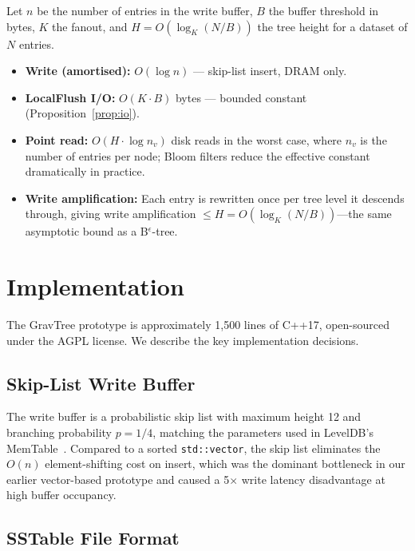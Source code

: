 \documentclass[10pt,twocolumn]{article}
\begin{document}
Let $n$ be the number of entries in the write buffer, $B$ the buffer threshold
in bytes, $K$ the fanout, and $H = O(\log_K (N/B))$ the tree height for
a dataset of $N$ entries.

\begin{itemize}
  \item \textbf{Write (amortised):} $O(\log n)$ --- skip-list insert, DRAM
        only.
  \item \textbf{LocalFlush I/O:} $O(K \cdot B)$ bytes --- bounded constant
        (Proposition~\ref{prop:io}).
  \item \textbf{Point read:} $O(H \cdot \log n_v)$ disk reads in the worst
        case, where $n_v$ is the number of entries per node; Bloom filters
        reduce the effective constant dramatically in practice.
  \item \textbf{Write amplification:} Each entry is rewritten once per tree
        level it descends through, giving write amplification $\leq H =
        O(\log_K (N/B))$---the same asymptotic bound as a B$^\epsilon$-tree.
\end{itemize}

\section{Implementation}
\label{sec:impl}

The GravTree prototype is approximately 1,500 lines of C++17, open-sourced
under the AGPL license.  We describe the key implementation decisions.

\subsection{Skip-List Write Buffer}

The write buffer is a probabilistic skip list with maximum height 12 and
branching probability $p = 1/4$, matching the parameters used in LevelDB's
MemTable~\cite{leveldb}.  Compared to a sorted \texttt{std::vector}, the skip
list eliminates the $O(n)$ element-shifting cost on insert, which was the
dominant bottleneck in our earlier vector-based prototype and caused a 5$\times$
write latency disadvantage at high buffer occupancy.

\subsection{SSTable File Format}
\end{document}
